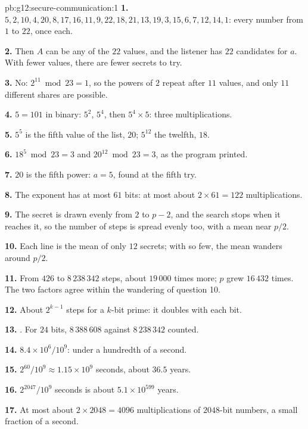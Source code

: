 \begin{solution}{pb:g12:secure-communication:1}
\textbf{1.} $5, 2, 10, 4, 20, 8, 17, 16, 11, 9, 22, 18, 21, 13, 19, 3, 15, 6, 7, 12, 14, 1$: every number from $1$ to
$22$, once each.

\textbf{2.} Then $A$ can be any of the $22$ values, and the listener has $22$ candidates for $a$. With fewer values,
there are fewer secrets to try.

\textbf{3.} No: $2^{11} \bmod 23 = 1$, so the powers of $2$ repeat after $11$ values, and only $11$ different shares
are possible.

\textbf{4.} $5 = 101$ in binary: $5^2$, $5^4$, then $5^4 \times 5$: three multiplications.

\textbf{5.} $5^5$ is the fifth value of the list, $20$; $5^{12}$ the twelfth, $18$.

\textbf{6.} $18^5 \bmod 23 = 3$ and $20^{12} \bmod 23 = 3$, as the program printed.

\textbf{7.} $20$ is the fifth power: $a = 5$, found at the fifth try.

\textbf{8.} The exponent has at most $61$ bits: at most about $2 \times 61 = 122$ multiplications.

\textbf{9.} The secret is drawn evenly from $2$ to $p - 2$, and the search stops when it reaches it, so the number of
steps is spread evenly too, with a mean near $p/2$.

\textbf{10.} Each line is the mean of only $12$ secrets; with so few, the mean wanders around $p/2$.

\textbf{11.} From $426$ to $8\,238\,342$ steps, about $19\,000$ times more; $p$ grew $16\,432$ times. The two factors
agree within the wandering of question 10.

\textbf{12.} About $2^{k - 1}$ steps for a $k$-bit prime: it doubles with each bit.

\textbf{13.} . For $24$ bits, $8\,388\,608$ against $8\,238\,342$
counted.

\textbf{14.} $8.4 \times 10^6 / 10^9$: under a hundredth of a second.

\textbf{15.} $2^{60} / 10^9 \approx 1.15 \times 10^9$ seconds, about $36.5$ years.

\textbf{16.} $2^{2047} / 10^9$ seconds is about $5.1 \times 10^{599}$ years.

\textbf{17.} At most about $2 \times 2048 = 4096$ multiplications of $2048$-bit numbers, a small fraction of a
second.


\end{solution}

